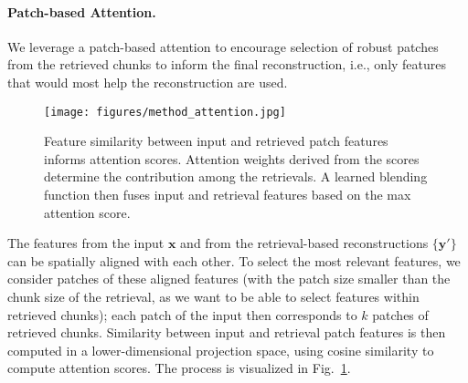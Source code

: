 \paragraph{Patch-based Attention.} We leverage a patch-based attention to encourage selection of robust patches from the retrieved chunks to inform the final reconstruction, i.e., only features that would most help the reconstruction are used.
%
\begin{figure}
	\centering
	\texttt{[image: figures/method\_attention.jpg]}
	\vspace{-0.5cm}
	\caption{Feature similarity between input and retrieved patch features informs attention scores. Attention weights derived from the scores determine the contribution among the retrievals. A learned blending function then fuses input and retrieval features based on the max attention score.}
	\label{fig:method_attention}
	\vspace{-0.25cm}
\end{figure}
%
The features from the input $\mathbf{x}$ and from the retrieval-based reconstructions $\{\mathbf{y}'\}$ can be spatially aligned with each other.
%
To select the most relevant features, we consider patches of these aligned features (with the patch size smaller than the chunk size of the retrieval, as we want to be able to select features within retrieved chunks); each patch of the input then corresponds to $k$ patches of retrieved chunks.
%
Similarity between input and retrieval patch features is then computed in a lower-dimensional projection space, using cosine similarity to compute attention scores. 
%
The process is visualized in Fig.~\ref{fig:method_attention}.

